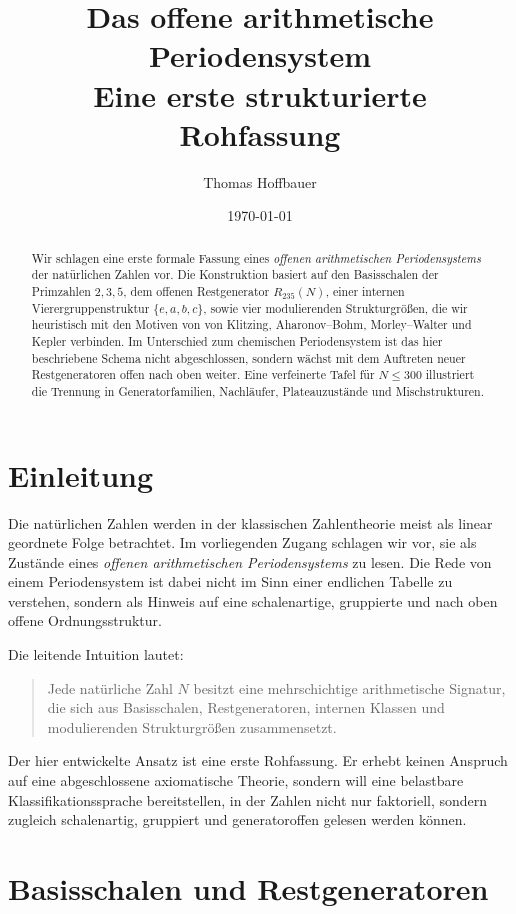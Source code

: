 \documentclass[11pt,a4paper]{article}
\title{Das offene arithmetische Periodensystem\\\large Eine erste strukturierte Rohfassung}
\author{Thomas Hoffbauer}
\date{\today}
\theoremstyle{plain}
\theoremstyle{definition}
\theoremstyle{remark}
\begin{document}
\maketitle

\begin{abstract}
Wir schlagen eine erste formale Fassung eines \emph{offenen arithmetischen Periodensystems} der natürlichen Zahlen vor. 
Die Konstruktion basiert auf den Basisschalen der Primzahlen \(2,3,5\), dem offenen Restgenerator \(R_{235}(N)\), einer internen Vierergruppenstruktur \(\{e,a,b,c\}\), sowie vier modulierenden Strukturgrößen, die wir heuristisch mit den Motiven von von Klitzing, Aharonov--Bohm, Morley--Walter und Kepler verbinden. 
Im Unterschied zum chemischen Periodensystem ist das hier beschriebene Schema nicht abgeschlossen, sondern wächst mit dem Auftreten neuer Restgeneratoren offen nach oben weiter. 
Eine verfeinerte Tafel für \(N\le 300\) illustriert die Trennung in Generatorfamilien, Nachläufer, Plateauzustände und Mischstrukturen.
\end{abstract}

\section{Einleitung}

Die natürlichen Zahlen werden in der klassischen Zahlentheorie meist als linear geordnete Folge betrachtet. 
Im vorliegenden Zugang schlagen wir vor, sie als Zustände eines \emph{offenen arithmetischen Periodensystems} zu lesen. 
Die Rede von einem Periodensystem ist dabei nicht im Sinn einer endlichen Tabelle zu verstehen, sondern als Hinweis auf eine schalenartige, gruppierte und nach oben offene Ordnungsstruktur.

Die leitende Intuition lautet:
\begin{quote}
Jede natürliche Zahl \(N\) besitzt eine mehrschichtige arithmetische Signatur, die sich aus Basisschalen, Restgeneratoren, internen Klassen und modulierenden Strukturgrößen zusammensetzt.
\end{quote}

Der hier entwickelte Ansatz ist eine erste Rohfassung. 
Er erhebt keinen Anspruch auf eine abgeschlossene axiomatische Theorie, sondern will eine belastbare Klassifikationssprache bereitstellen, in der Zahlen nicht nur faktoriell, sondern zugleich schalenartig, gruppiert und generatoroffen gelesen werden können.

\section{Basisschalen und Restgeneratoren}
\end{document}
